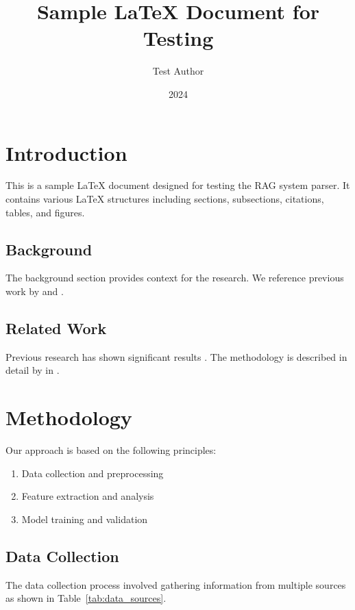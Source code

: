 \documentclass{article}
\title{Sample LaTeX Document for Testing}
\author{Test Author}
\date{2024}
\begin{document}
\maketitle

\section{Introduction}
\label{sec:intro}

This is a sample LaTeX document designed for testing the RAG system parser. It contains various LaTeX structures including sections, subsections, citations, tables, and figures.

\subsection{Background}
\label{subsec:background}

The background section provides context for the research. We reference previous work by \cite{einstein1905} and \citep{newton1687}.

\subsection{Related Work}
\label{subsec:related}

Previous research has shown significant results \citet{smith2023}. The methodology is described in detail by \citeauthor{jones2022} in \citeyear{jones2022}.

\section{Methodology}
\label{sec:method}

Our approach is based on the following principles:

\begin{enumerate}
\item Data collection and preprocessing
\item Feature extraction and analysis
\item Model training and validation
\end{enumerate}

\subsection{Data Collection}
\label{subsec:data}

The data collection process involved gathering information from multiple sources as shown in Table~\ref{tab:data_sources}.
\end{document}
